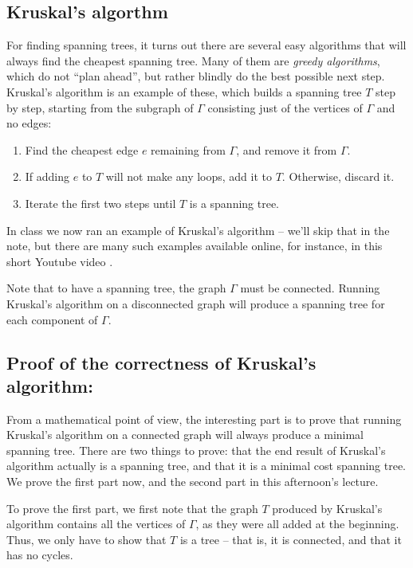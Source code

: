 \documentclass[]{article}
\providecommand{\tightlist}{%
  \setlength{\itemsep}{0pt}\setlength{\parskip}{0pt}}
\begin{document}
\subsection{Kruskal's algorthm}\label{kruskals-algorthm}

For finding spanning trees, it turns out there are several easy
algorithms that will always find the cheapest spanning tree. Many of
them are \emph{greedy algorithms}, which do not ``plan ahead'', but
rather blindly do the best possible next step. Kruskal's algorithm is an
example of these, which builds a spanning tree \(T\) step by step,
starting from the subgraph of \(\Gamma\) consisting just of the vertices
of \(\Gamma\) and no edges:

\begin{enumerate}
\def\labelenumi{\arabic{enumi}.}
\tightlist
\item
  Find the cheapest edge \(e\) remaining from \(\Gamma\), and remove it
  from \(\Gamma\).
\item
  If adding \(e\) to \(T\) will not make any loops, add it to \(T\).
  Otherwise, discard it.
\item
  Iterate the first two steps until \(T\) is a spanning tree.
\end{enumerate}

In class we now ran an example of Kruskal's algorithm -- we'll skip that
in the note, but there are many such examples available online, for
instance, in this short Youtube video .

Note that to have a spanning tree, the graph \(\Gamma\) must be
connected. Running Kruskal's algorithm on a disconnected graph will
produce a spanning tree for each component of \(\Gamma\).




\subsection{Proof of the correctness of Kruskal's
algorithm:}\label{proof-of-the-correctness-of-kruskals-algorithm}

From a mathematical point of view, the interesting part is to prove that
running Kruskal's algorithm on a connected graph will always produce a
minimal spanning tree. There are two things to prove: that the end
result of Kruskal's algorithm actually is a spanning tree, and that it
is a minimal cost spanning tree. We prove the first part now, and the
second part in this afternoon's lecture.

To prove the first part, we first note that the graph \(T\) produced by
Kruskal's algorithm contains all the vertices of \(\Gamma\), as they
were all added at the beginning. Thus, we only have to show that \(T\)
is a tree -- that is, it is connected, and that it has no cycles.
\end{document}
